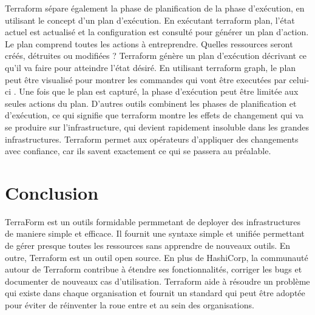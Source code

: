 \documentclass[]{article}
\begin{document}
Terraform sépare également la phase de planification de la phase
d'exécution, en utilisant le concept d'un plan d'exécution. En exécutant
terraform plan, l'état actuel est actualisé et la configuration est
consulté pour générer un plan d'action. Le plan comprend toutes les
actions à entreprendre. Quelles ressources seront créés, détruites ou
modifiées ? Terraform génère un plan d'exécution décrivant ce qu'il va
faire pour atteindre l'état désiré. En utilisant terraform graph, le
plan peut être visualisé pour montrer les commandes qui vont être
executées par celui-ci . Une fois que le plan est capturé, la phase
d'exécution peut être limitée aux seules actions du plan. D'autres
outils combinent les phases de planification et d'exécution, ce qui
signifie que terraform montre les effets de changement qui va se
produire sur l'infrastructure, qui devient rapidement insoluble dans les
grandes infrastructures. Terraform permet aux opérateurs d'appliquer des
changements avec confiance, car ils savent exactement ce qui se passera
au préalable.

\section{Conclusion}\label{conclusion}

TerraForm est un outils formidable permmetant de deployer des
infrastructures de maniere simple et efficace. Il fournit une syntaxe
simple et unifiée permettant de gérer presque toutes les ressources sans
apprendre de nouveaux outils. En outre, Terraform est un outil open
source. En plus de HashiCorp, la communauté autour de Terraform
contribue à étendre ses fonctionnalités, corriger les bugs et documenter
de nouveaux cas d'utilisation. Terraform aide à résoudre un problème qui
existe dans chaque organisation et fournit un standard qui peut être
adoptée pour éviter de réinventer la roue entre et au sein des
organisations.
\end{document}
